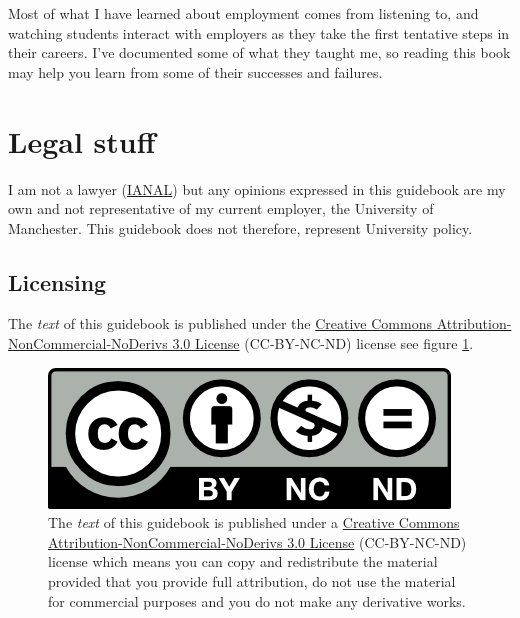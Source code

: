 \documentclass[
]{book}
\begin{document}
Most of what I have learned about employment comes from listening to, and watching students interact with employers as they take the first tentative steps in their careers. I've documented some of what they taught me, so reading this book may help you learn from some of their successes and failures.

\hypertarget{legal}{%
\section{Legal stuff}\label{legal}}

I am not a lawyer (\href{https://en.wikipedia.org/wiki/IANAL}{IANAL}) but any opinions expressed in this guidebook are my own and not representative of my current employer, the University of Manchester. This guidebook does not therefore, represent University policy.

\hypertarget{license}{%
\subsection{Licensing}\label{license}}

The \emph{text} of this guidebook is published under the \href{https://creativecommons.org/licenses/by-nc-nd/3.0/}{Creative Commons Attribution-NonCommercial-NoDerivs 3.0 License} (CC-BY-NC-ND) license see figure \ref{fig:cc-by-nc-nd-fig}.

\begin{figure}

{\centering \includegraphics[width=1\linewidth]{images/by-nc-nd} 

}

\caption{The \emph{text} of this guidebook is published under a \href{https://creativecommons.org/licenses/by-nc-nd/3.0/}{Creative Commons Attribution-NonCommercial-NoDerivs 3.0 License} (CC-BY-NC-ND) license which means you can copy and redistribute the material provided that you provide full attribution, do not use the material for commercial purposes and you do not make any derivative works.}\label{fig:cc-by-nc-nd-fig}
\end{figure}
\end{document}
